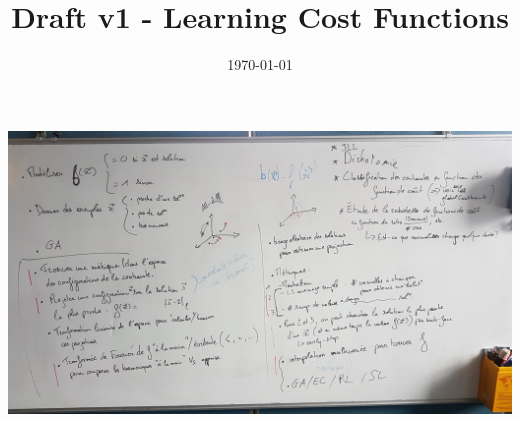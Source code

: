 \documentclass[a4paper, 12pt]{article}
\title{Draft v1 - Learning Cost Functions}
\date{\today}
\begin{document}
\maketitle

\includegraphics[width=\linewidth,angle=180]{20190529_whiteboard}
\end{document}
